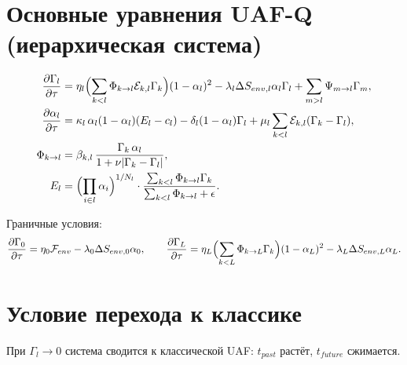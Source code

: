 \documentclass[12pt]{article}
\begin{document}
\section{Основные уравнения UAF-Q (иерархическая система)}

\begin{align}
\frac{\partial \Gamma_l}{\partial \tau} &= 
\eta_l\Bigl(\sum_{k<l}\Phi_{k\to l}\mathcal{E}_{k,l}\Gamma_k\Bigr)(1-\alpha_l)^2 
- \lambda_l\Delta S_{env,l}\alpha_l\Gamma_l 
+ \sum_{m>l}\Psi_{m\to l}\Gamma_m, \\
\frac{\partial \alpha_l}{\partial \tau} &= 
\kappa_l\,\alpha_l(1-\alpha_l)(E_l-c_l) 
- \delta_l(1-\alpha_l)\Gamma_l 
+ \mu_l\sum_{k<l}\mathcal{E}_{k,l}(\Gamma_k-\Gamma_l), \\
\Phi_{k\to l} &= \beta_{k,l}\,\frac{\Gamma_k\,\alpha_l}{1 + \nu|\Gamma_k-\Gamma_l|}, \\
E_l &= \Bigl(\prod_{i\in l}\alpha_i\Bigr)^{1/N_l} \cdot 
\frac{\sum_{k<l}\Phi_{k\to l}\Gamma_k}{\sum_{k<l}\Phi_{k\to l}+\epsilon}.
\end{align}

\noindent Граничные условия:
\[
\frac{\partial \Gamma_0}{\partial \tau} = \eta_0\mathcal{F}_{env} - \lambda_0\Delta S_{env,0}\alpha_0,\qquad
\frac{\partial \Gamma_L}{\partial \tau} = \eta_L\Bigl(\sum_{k<L}\Phi_{k\to L}\Gamma_k\Bigr)(1-\alpha_L)^2 - \lambda_L\Delta S_{env,L}\alpha_L.
\]

\section{Условие перехода к классике}
При $\Gamma_l \to 0$ система сводится к классической UAF: $t_{past}$ растёт, $t_{future}$ сжимается.
\end{document}
